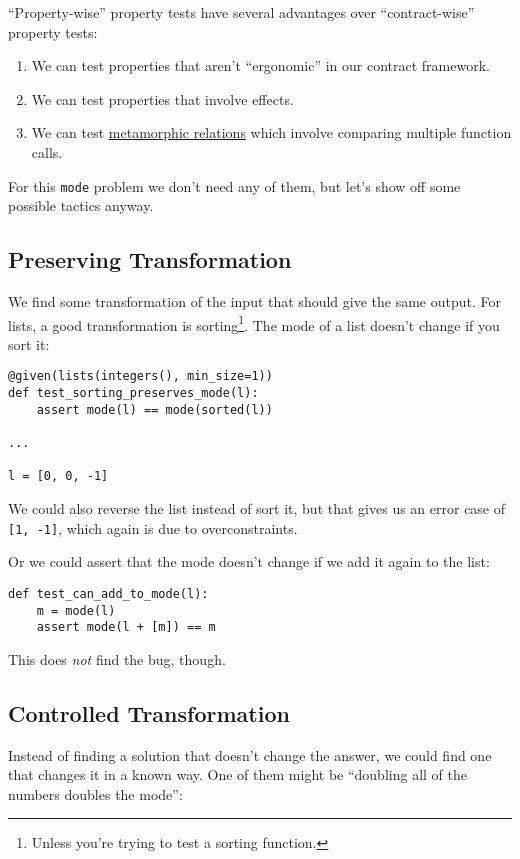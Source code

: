 ``Property-wise'' property tests have several advantages over
``contract-wise'' property tests:

\begin{enumerate}

\item
  We can test properties that aren't ``ergonomic'' in our contract
  framework.
\item
  We can test properties that involve effects.
\item
  We can test
  \href{https://www.hillelwayne.com/post/metamorphic-testing/}{metamorphic
  relations} which involve comparing multiple function calls.
\end{enumerate}
For this \texttt{mode} problem we don't need any of them, but let's show
off some possible tactics anyway.

\subsection{Preserving
Transformation}\label{preserving-transformation}

We find some transformation of the input that should give the same
output. For lists, a good transformation is
sorting\footnote{Unless you're trying to test a sorting function.}.
The mode of a list doesn't change if you sort it:

\begin{verbatim}
@given(lists(integers(), min_size=1))
def test_sorting_preserves_mode(l):
    assert mode(l) == mode(sorted(l))

...

l = [0, 0, -1]
\end{verbatim}
We could also reverse the list instead of sort it, but that gives us an
error case of \texttt{{[}1,\ -1{]}}, which again is due to
overconstraints.

Or we could assert that the mode doesn't change if we add it again to
the list:

\begin{verbatim}
def test_can_add_to_mode(l):
    m = mode(l)
    assert mode(l + [m]) == m
\end{verbatim}
This does \emph{not} find the bug, though.

\subsection{Controlled
Transformation}\label{controlled-transformation}

Instead of finding a solution that doesn't change the answer, we could
find one that changes it in a known way. One of them might be ``doubling
all of the numbers doubles the mode'':

